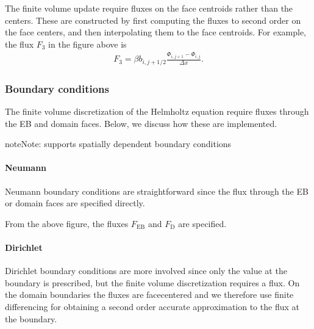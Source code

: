 \documentclass[letterpaper,10pt,english]{sphinxmanual}
\begin{document}
The finite volume update require fluxes on the face centroids rather than the centers.
These are constructed by first computing the fluxes to second order on the face centers, and then interpolating them to the face centroids.
For example, the flux \(F_3\) in the figure above is
\begin{equation*}
\begin{split}F_3 = \beta b_{i,j+1/2}\frac{\Phi_{i,j+1} - \Phi_{i,j}}{\Delta x}.\end{split}
\end{equation*}

\subsubsection{Boundary conditions}
\label{\detokenize{Source/LinearSolvers:boundary-conditions}}
The finite volume discretization of the Helmholtz equation require fluxes through the EB and domain faces.
Below, we discuss how these are implemented.

\begin{sphinxadmonition}{note}{Note:}
 supports spatially dependent boundary conditions
\end{sphinxadmonition}


\paragraph{Neumann}
\label{\detokenize{Source/LinearSolvers:neumann}}
Neumann boundary conditions are straightforward since the flux through the EB or domain faces are specified directly.

From the above figure, the fluxes \(F_{\textrm{EB}}\) and \(F_{\textrm{D}}\) are specified.


\paragraph{Dirichlet}
\label{\detokenize{Source/LinearSolvers:dirichlet}}\label{\detokenize{Source/LinearSolvers:chap-linearsolverdirichletbc}}
Dirichlet boundary conditions are more involved since only the value at the boundary is prescribed, but the finite volume discretization requires a flux.
On the domain boundaries the fluxes are face\sphinxhyphen{}centered and we therefore use finite differencing for obtaining a second order accurate approximation to the flux at the boundary.
\end{document}
